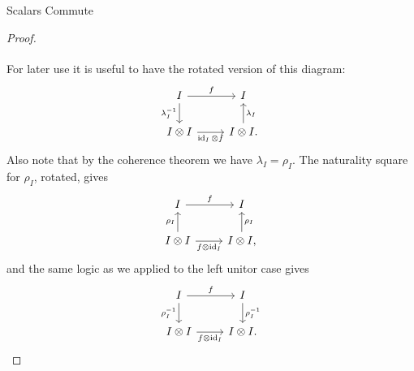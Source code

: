 \documentclass[fleqn]{NotesClass}
\DeclareMathOperator{\id}{id}
\begin{document}
\begin{lma}{Scalars Commute}{}
\begin{proof}
\begin{equation}
\begin{tikzcd}
                \end{tikzcd}
            \end{equation}
            For later use it is useful to have the rotated version of this diagram:
            \begin{equation}
                \begin{tikzcd}
                    I \arrow[r, "f"] \arrow[d, "\lambda_I^{-1}"'] & I\\
                    I \otimes I \arrow[r, "\id_I \otimes f"'] & I \otimes I. \arrow[u, "\lambda_I"']
                \end{tikzcd}
            \end{equation}
            Also note that by the coherence theorem we have \(\lambda_I = \rho_I\).
            The naturality square for \(\rho_I\), rotated, gives
            \begin{equation}
                \begin{tikzcd}
                    I \arrow[r, "f"] & I \\
                    I\otimes I \arrow[r, "f \otimes \id_I"'] \arrow[u, "\rho_I"] & I\otimes I, \arrow[u, "\rho_I"']
                \end{tikzcd}
            \end{equation}
            and the same logic as we applied to the left unitor case gives
            \begin{equation}
                \begin{tikzcd}
                    I \arrow[r, "f"] \arrow[d, "\rho_I^{-1}"'] & I \arrow[d, "\rho_I^{-1}"]\\
                    I \otimes I \arrow[r, "f \otimes \id_I"'] & I \otimes I.
                \end{tikzcd}
            \end{equation}
            

\end{proof}
\end{lma}
\end{document}
